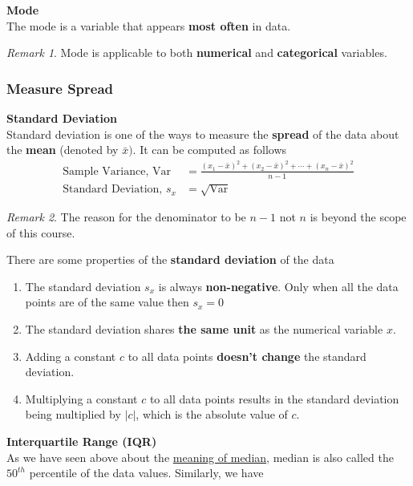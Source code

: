 \documentclass[math,code]{amznotes}
\theoremstyle{remark}
\newtheorem*{remark}{Remark}
\begin{document}
\textbf{Mode}\\
The mode is a variable that appears \textbf{most often} in data.
\begin{notebox}
    \begin{remark}
        Mode is applicable to both \textbf{numerical} and \textbf{categorical} variables.
    \end{remark}
\end{notebox}

\subsubsection{Measure Spread}
\textbf{Standard Deviation} \\
Standard deviation is one of the ways to measure the \textbf{spread} of the data about the \textbf{mean} (denoted by $\bar{x})$. It can be computed as follows
\begin{align*}
    \text{Sample Variance, Var}&=\frac{(x_1-\bar{x})^2+(x_2-\bar{x})^2+\cdots+(x_n-\bar{x})^2}{n-1} \\
    \text{Standard Deviation, }s_x&=\sqrt{\text{Var}}
\end{align*}
\begin{notebox}
    \begin{remark}
        The reason for the denominator to be $n-1$ not $n$ is beyond the scope of this course.
    \end{remark}
\end{notebox}
There are some properties of the \textbf{standard deviation} of the data
\begin{enumerate}
    \item The standard deviation $s_x$ is always \textbf{non-negative}. Only when all the data points are of the same value then $s_x=0$
    \item The standard deviation shares \textbf{the same unit} as the numerical variable $x$.
    \item Adding a constant $c$ to all data points \textbf{doesn't change} the standard deviation.
    \item Multiplying a constant $c$ to all data points results in the standard deviation being multiplied by $|c|$, which is the absolute value of $c$.
\end{enumerate}
\textbf{Interquartile Range (IQR)} \\
As we have seen above about the \hyperlink{chapter1-median-meaning}{meaning of median}, median is also called the $50^{th}$ percentile of the data values. Similarly, we have 
\end{document}
